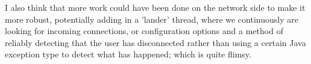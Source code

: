 \documentclass[11pt]{article}
\begin{document}
I also think that more work could have been done on the network side to make it more robust, potentially adding in a 'lander' thread, where we continuously are looking for incoming connections, or configuration options and a method of reliably detecting that the user has disconnected rather than using a certain Java exception type to detect what has happened; which is quite flimsy. 




%
%
%
%
%
%
%
%
%
\end{document}
